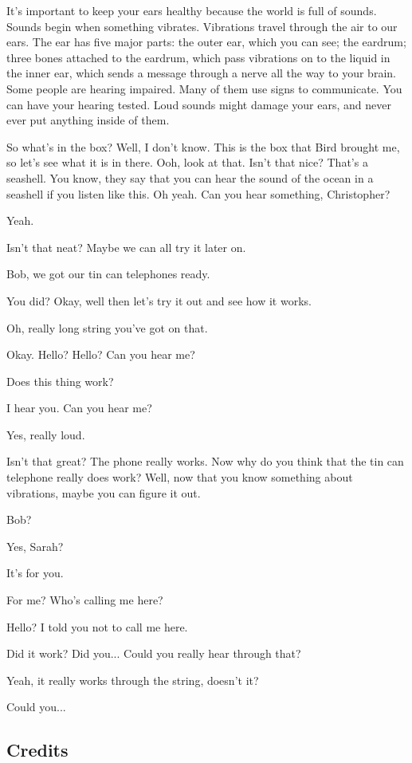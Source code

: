 It's important to keep your ears healthy because the world is full of sounds. Sounds begin when something vibrates. Vibrations travel through the air to our ears. The ear has five major parts: the outer ear, which you can see; the eardrum; three bones attached to the eardrum, which pass vibrations on to the liquid in the inner ear, which sends a message through a nerve all the way to your brain. Some people are hearing impaired. Many of them use signs to communicate. You can have your hearing tested. Loud sounds might damage your ears, and never ever put anything inside of them.

So what's in the box? Well, I don't know. This is the box that Bird brought me, so let's see what it is in there. Ooh, look at that. Isn't that nice? That's a seashell. You know, they say that you can hear the sound of the ocean in a seashell if you listen like this. Oh yeah. Can you hear something, Christopher?

Yeah.

Isn't that neat? Maybe we can all try it later on.

Bob, we got our tin can telephones ready.

You did? Okay, well then let's try it out and see how it works.

Oh, really long string you've got on that.

Okay. Hello? Hello? Can you hear me?

Does this thing work?

I hear you. Can you hear me?

Yes, really loud.

Isn't that great? The phone really works. Now why do you think that the tin can telephone really does work? Well, now that you know something about vibrations, maybe you can figure it out.

Bob?

Yes, Sarah?

It's for you.

For me? Who's calling me here?

Hello? I told you not to call me here.

Did it work? Did you... Could you really hear through that?

Yeah, it really works through the string, doesn't it?

Could you...

\subsection{Credits}

